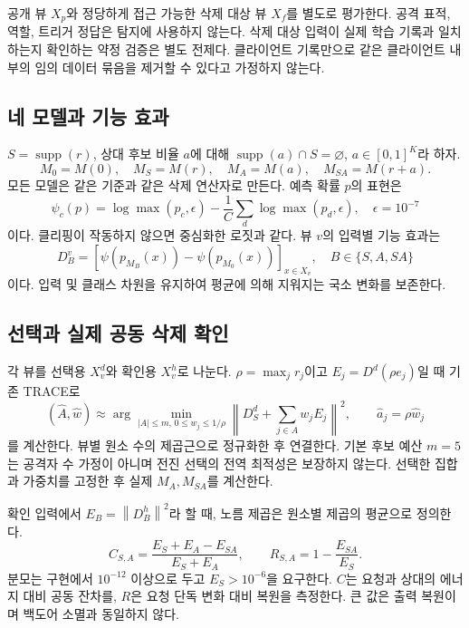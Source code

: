 \documentclass[10pt,a4paper]{article}
\newcommand{\norm}[1]{\left\lVert#1\right\rVert}
\begin{document}
공개 뷰 $X_p$와 정당하게 접근 가능한 삭제 대상 뷰 $X_f$를 별도로 평가한다.
공격 표적, 역할, 트리거 정답은 탐지에 사용하지 않는다.
삭제 대상 입력이 실제 학습 기록과 일치하는지 확인하는 약정 검증은 별도 전제다.
클라이언트 기록만으로 같은 클라이언트 내부의 임의 데이터 묶음을 제거할 수 있다고 가정하지 않는다.

\subsection{네 모델과 기능 효과}
$S=\operatorname{supp}(r)$, 상대 후보 비율 $a$에 대해
$\operatorname{supp}(a)\cap S=\varnothing$, $a\in[0,1]^K$라 하자.
\begin{equation}
 M_0=M(0),\quad M_S=M(r),\quad M_A=M(a),\quad M_{SA}=M(r+a).
\end{equation}
모든 모델은 같은 기준과 같은 삭제 연산자로 만든다. 예측 확률 $p$의 표현은
\begin{equation}
 \psi_c(p)=\log\max(p_c,\epsilon)-\frac1C\sum_d\log\max(p_d,\epsilon),
 \quad\epsilon=10^{-7}
\end{equation}
이다. 클리핑이 작동하지 않으면 중심화한 로짓과 같다.
뷰 $v$의 입력별 기능 효과는
\begin{equation}
 D_B^v=[\psi(p_{M_B}(x))-\psi(p_{M_0}(x))]_{x\in X_v},\quad B\in\{S,A,SA\}
\end{equation}
이다. 입력 및 클래스 차원을 유지하여 평균에 의해 지워지는 국소 변화를 보존한다.

\subsection{선택과 실제 공동 삭제 확인}
각 뷰를 선택용 $X_v^d$와 확인용 $X_v^h$로 나눈다.
$\rho=\max_jr_j$이고 $E_j=D^d(\rho e_j)$일 때 기존 TRACE로
\begin{equation}
 (\hat A,\hat w)\approx\arg\min_{|A|\le m,\,0\le w_j\le1/\rho}
 \norm{D_S^d+\sum_{j\in A}w_jE_j}^2,\qquad \hat a_j=\rho\hat w_j
\end{equation}
를 계산한다. 뷰별 원소 수의 제곱근으로 정규화한 후 연결한다.
기본 후보 예산 $m=5$는 공격자 수 가정이 아니며 전진 선택의 전역 최적성은 보장하지 않는다.
선택한 집합과 가중치를 고정한 후 실제 $M_A,M_{SA}$를 계산한다.

확인 입력에서 $E_B=\norm{D_B^h}^2$라 할 때, 노름 제곱은 원소별 제곱의 평균으로 정의한다.
\begin{equation}\label{eq:pair}
 C_{S,A}=\frac{E_S+E_A-E_{SA}}{E_S+E_A},\qquad
 R_{S,A}=1-\frac{E_{SA}}{E_S}.
\end{equation}
분모는 구현에서 $10^{-12}$ 이상으로 두고 $E_S>10^{-6}$을 요구한다.
$C$는 요청과 상대의 에너지 대비 공동 잔차를, $R$은 요청 단독 변화 대비 복원을 측정한다.
큰 값은 출력 복원이며 백도어 소멸과 동일하지 않다.
\end{document}

